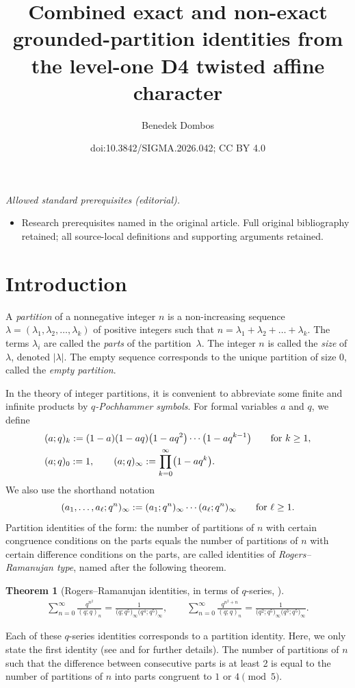 \documentclass[10pt,a4paper]{amsart}
\title{Combined exact and non-exact grounded-partition identities from the level-one D4 twisted affine character}
\author{Benedek Dombos}
\date{doi:10.3842/SIGMA.2026.042; CC BY 4.0}
\numberwithin{equation}{section}
\newtheorem{Theorem}{Theorem}[section]
\theoremstyle{definition}
\begin{document}
\maketitle
\noindent\textit{Allowed standard prerequisites (editorial).}\begin{itemize}
\item Research prerequisites named in the original article. Full original bibliography retained; all source-local definitions and supporting arguments retained.
\end{itemize}\medskip
\section{Introduction}

A \emph{partition} of a nonnegative integer $ n $ is a non-increasing sequence $\lambda = (\lambda_1, \lambda_2, \dots, \lambda_k)$ of positive integers such that $n = \lambda_1 + \lambda_2 + \dots + \lambda_k$. The terms $ \lambda_i $ are called the \emph{parts} of the partition~$\lambda$. The integer $n$ is called the \emph{size} of $\lambda$, denoted $|\lambda|$. The empty sequence corresponds to the unique partition of size $0$, called the \emph{empty partition}.

In the theory of integer partitions, it is convenient to abbreviate some finite and infinite products by \emph{$q$-Pochhammer symbols}. For formal variables $a$ and $q$, we define
\begin{align*}
 & (a;q)_k := (1 - a)(1 - aq)\bigl(1 - aq^2\bigr) \cdots \bigl(1 - aq^{k-1}\bigr) \qquad\text{for $ k \geq 1 $},\\
 & (a;q)_0:= 1, \qquad (a;q)_\infty := \prod_{k=0}^{\infty} \bigl(1 - aq^k\bigr).
\end{align*}
We also use the shorthand notation
\[(a_1, \ldots, a_\ell; q^n)_\infty := (a_1; q^n)_\infty \cdots (a_\ell; q^n)_\infty \qquad\text{for $ \ell \geq 1 $}.\]
Partition identities of the form: the number of partitions of $n$ with certain congruence conditions on the parts equals the number of partitions of $n$ with certain difference conditions on the parts, are called identities of \emph{Rogers--Ramanujan type}, named after the following theorem.

\begin{Theorem}[Rogers--Ramanujan identities, in terms of $q$-series, \cite{RR19}]%
\begin{align*}
 \sum_{n=0}^{\infty} \frac{q^{n^2}}{(q;q)_n} = \frac{1}{\bigl(q;q^5\bigr)_\infty \bigl(q^4;q^5\bigr)_\infty}, \qquad
 \sum_{n=0}^{\infty} \frac{q^{n^2+n}}{(q;q)_n} = \frac{1}{\bigl(q^2;q^5\bigr)_\infty \bigl(q^3;q^5\bigr)_\infty}.
\end{align*}
\end{Theorem}
Each of these $q$-series identities corresponds to a partition identity. Here, we only state the first identity (see \cite{Mac16} and \cite{Sch17} for further details). The number of partitions of $ n $ such that the difference between consecutive parts is at least 2 is equal to the number of partitions of $ n $ into parts congruent to $ 1 $ or $ 4 \pmod 5 $.
\end{document}

